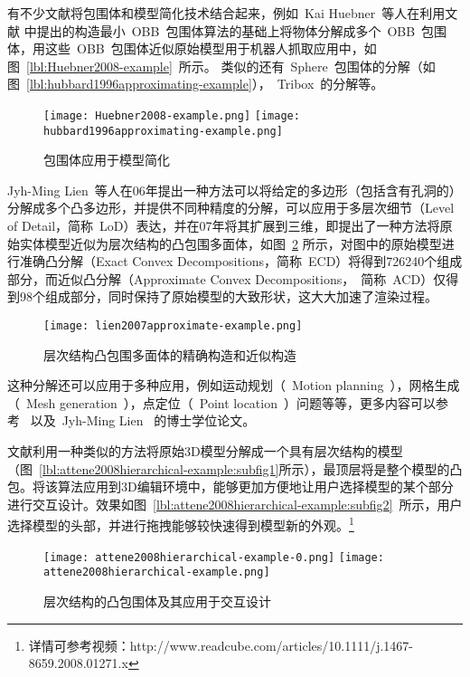 有不少文献将包围体和模型简化技术结合起来，例如~Kai Huebner~等人\cite{huebner2008minimum}在利用文献
中提出的构造最小~OBB~包围体算法的基础上将物体分解成多个~OBB~包围体，用这些~OBB~包围体近似原始模型用于机器人抓取应用中，如图~\ref{lbl:Huebner2008-example}~所示。
类似的还有~Sphere~包围体的分解\cite{hubbard1996approximating}（如图~\ref{lbl:hubbard1996approximating-example}），~Tribox~的分解\cite{crosnier1999tribox}等。
\begin{figure}[htbp]
  \centering
    {\texttt{[image: Huebner2008-example.png]}}
    {\texttt{[image: hubbard1996approximating-example.png]}}
  \caption{包围体应用于模型简化}
  \label{lbl:bounding-voluems-used-in-shape-approximation}
\end{figure}
Jyh-Ming Lien~\cite{lien2006approximate2d}等人在06年提出一种方法可以将给定的多边形（包括含有孔洞的）分解成多个凸多边形，并提供不同种精度的分解，可以应用于多层次细节（Level of
Detail，简称~LoD）表达，并在07年将其扩展到三维\cite{lien2007approximate3d}，即提出了一种方法将原始实体模型近似为层次结构的凸包围多面体，如图~\ref{lbl:lien2007approximate-example}
所示，对图中的原始模型进行准确凸分解（Exact Convex
Decompositions，简称~ECD）将得到726240个组成部分，而近似凸分解（Approximate Convex
Decompositions，~简称~ACD）仅得到98个组成部分，同时保持了原始模型的大致形状，这大大加速了渲染过程。
\begin{figure}[htbp]
\centering
\texttt{[image: lien2007approximate-example.png]}
\caption{层次结构凸包围多面体的精确构造和近似构造\cite{lien2007approximate3d}}
\label{lbl:lien2007approximate-example}
\end{figure}
这种分解还可以应用于多种应用，例如运动规划（~Motion planning~），网格生成（~Mesh generation~），点定位（~Point location~）问题等等，更多内容可以参考~ 以及~Jyh-Ming Lien~ 的博士学位论文\cite{lien2006approximatephd}。

文献利用一种类似的方法将原始3D模型分解成一个具有层次结构的模型（图~\ref{lbl:attene2008hierarchical-example:subfig1}所示），最顶层将是整个模型的凸包。将该算法应用到3D编辑环境中，能够更加方便地让用户选择模型的某个部分进行交互设计。效果如图~\ref{lbl:attene2008hierarchical-example:subfig2}~所示，用户选择模型的头部，并进行拖拽能够较快速得到模型新的外观。\footnote{详情可参考视频：http://www.readcube.com/articles/10.1111/j.1467-8659.2008.01271.x }
\begin{figure}[htbp]
  \centering
    {\texttt{[image: attene2008hierarchical-example-0.png]}}
    {\texttt{[image: attene2008hierarchical-example.png]}}
  \caption{层次结构的凸包围体及其应用于交互设计\cite{attene2008hierarchical}}
  \label{lbl:attene2008hierarchical-example}
\end{figure}

